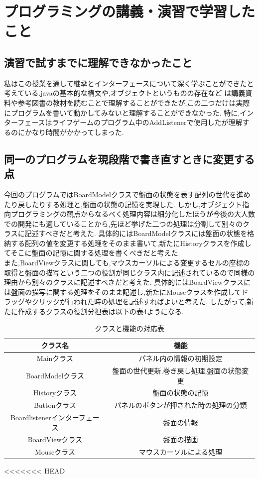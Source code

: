 \documentclass[dvipdfmx]{jarticle}
\begin{document}
\section{プログラミングの講義・演習で学習したこと}
\subsection{演習で試すまでに理解できなかったこと}
私はこの授業を通して継承とインターフェースについて深く学ぶことができたと考えている.javaの基本的な構文や,オブジェクトというものの存在など
は講義資料や参考図書の教材を読むことで理解することができたが,この二つだけは実際にプログラムを書いて動かしてみないと理解することができなかった.
特に,インターフェースはライフゲームのプログラム中のAddListenerで使用したが理解するのにかなり時間がかかってしまった.
\subsection{同一のプログラムを現段階で書き直すときに変更する点}
今回のプログラムではBoardModelクラスで盤面の状態を表す配列の世代を進めたり戻したりする処理と,盤面の状態の記憶を実現した.
しかし,オブジェクト指向プログラミングの観点からなるべく処理内容は細分化したほうが今後の大人数での開発にも適していることから,先ほど挙げた二つの処理は分割して別々のクラスに記述すべきだと考えた.
具体的にはBoardModelクラスには盤面の状態を格納する配列の値を変更する処理をそのまま書いて,新たにHistoryクラスを作成してそこに盤面の記憶に関する処理を書くべきだと考えた.\\
また,BoardViewクラスに関しても,マウスカーソルによる変更するセルの座標の取得と盤面の描写という二つの役割が同じクラス内に記述されているので同様の理由から別々のクラスに記述すべきだと考えた.
具体的にはBoardViewクラスには盤面の描写に関する処理をそのまま記述し,新たにMouseクラスを作成してドラッグやクリックが行われた時の処理を記述すればよいと考えた.
したがって,新たに作成するクラスの役割分担表は以下の表4ようになる.
\begin{table}[h]
  \centering
  \begin{tabular}{|c|c|}
    \hline
    クラス名&機能\\\hline\hline
    Mainクラス&パネル内の情報の初期設定\\\hline
    BoardModelクラス&盤面の世代更新,巻き戻し処理,盤面の状態変更\\\hline
    Historyクラス&盤面の状態の記憶\\\hline
    Buttonクラス&パネルのボタンが押された時の処理の分類\\\hline
    Boardlistenerインターフェース&盤面の情報\\\hline
    BoardViewクラス&盤面の描画\\\hline
    Mouseクラス&マウスカーソルによる処理\\\hline
  \end{tabular}
  \caption{クラスと機能の対応表}
\end{table}
<<<<<<< HEAD
\end{document}
